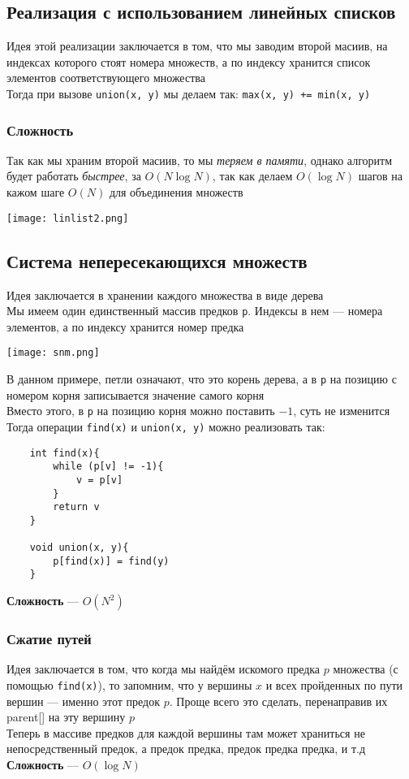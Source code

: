 \documentclass[a4paper]{article}
\newcommand{\code}[1]{\colorbox{codegray}{\texttt{#1}}}
\begin{document}
\subsection{Реализация с использованием линейных списков}
Идея этой реализации заключается в том, что мы заводим второй масиив, на индексах которого стоят номера множеств, а по индексу хранится список элементов соответствующего множества\\[2mm]
\indent Тогда при вызове \code{union(x, y)} мы делаем так: \code{max(x, y) += min(x, y)}
\subsubsection*{Сложность}
Так как мы храним второй масиив, то мы \textit{теряем в памяти}, однако алгоритм будет работать \textit{быстрее}, за $O(N\log N)$, так как делаем $O(\log N)$ шагов на кажом шаге $O(N)$ для объединения множеств
\begin{center}
    \texttt{[image: linlist2.png]}
    \label{union-find-lin}
\end{center}

\subsection{Система непересекающихся множеств}
Идея заключается в хранении каждого множества в виде дерева\\[2mm]
\indent Мы имеем один единственный массив предков \code{p}. Индексы в нем — номера элементов, а по индексу хранится номер предка
\begin{center}
    \texttt{[image: snm.png]}
    \label{dsu}
\end{center}
В данном примере, петли означают, что это корень дерева, а в \code{p} на позицию с номером корня записывается значение самого корня\\[2mm]
Вместо этого, в \code{p} на позицию корня можно поставить $-1$, суть не изменится\\[2mm]
Тогда операции \code{find(x)} и \code{union(x, y)} можно реализовать так:
\begin{lstlisting}
    int find(x){
        while (p[v] != -1){
            v = p[v]
        }
        return v
    }
    
    void union(x, y){
        p[find(x)] = find(y)
    }
\end{lstlisting}
\indent\textbf{Сложность} — $O(N^2)$
\subsubsection{Сжатие путей}
Идея заключается в том, что когда мы найдём искомого предка $p$ множества (с помощью \code{find(x)}), то запомним, что у вершины $x$ и всех пройденных по пути вершин — именно этот предок $p$. Проще всего это сделать, перенаправив их {\rm parent}[] на эту вершину $p$\\[2mm]
\indent Теперь в массиве предков для каждой вершины там может храниться не непосредственный предок, а предок предка, предок предка предка, и т.д\\[2mm]
\indent \textbf{Сложность} — $O(\log N)$
\end{document}
